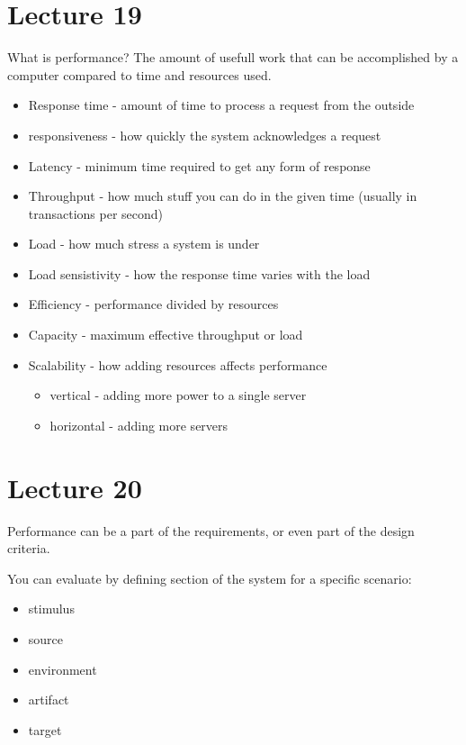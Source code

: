 \documentclass{article}
\begin{document}

\section*{Lecture 19} %
\label{sec:lecture_19}
What is performance? The amount of usefull work that can be accomplished by a computer compared to time and resources used.

\begin{itemize}
    \item Response time - amount of time to process a request from the outside
    \item responsiveness - how quickly the system acknowledges a request
    \item Latency - minimum time required to get any form of response
    \item Throughput - how much stuff you can do in the given time (usually in transactions per second)
    \item Load - how much stress a system is under
    \item Load sensistivity - how the response time varies with the load
    \item Efficiency - performance divided by resources
    \item Capacity - maximum effective throughput or load
    \item Scalability - how adding resources affects performance
    \begin{itemize}
        \item vertical - adding more power to a single server
        \item horizontal - adding more servers
    \end{itemize}
\end{itemize}

\section*{Lecture 20} %
\label{sec:lecture_20}
Performance can be a part of the requirements, or even part of the design criteria.

You can evaluate by defining section of the system for a specific scenario:
\begin{itemize}
    \item stimulus
    \item source
    \item environment
    \item artifact
    \item target
\end{itemize}
\end{document}
